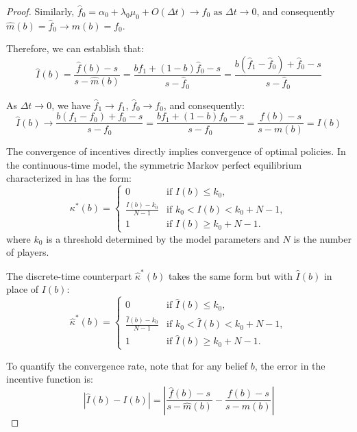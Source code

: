 \begin{proof}
Similarly, $\hat{f}_0 = \alpha_0 + \lambda_0\mu_0 + O(\Delta t) \to f_0 \text{ as } \Delta t \to 0$, and consequently $\hat{m}(b) = \hat{f}_0 \to m(b) = f_0$.

Therefore, we can establish that:
\begin{equation}
    \hat{I}(b) = \frac{\hat{f}(b) - s}{s - \hat{m}(b)} = \frac{b \hat{f}_1 + (1-b) \hat{f}_0 - s}{s - \hat{f}_0} = \frac{b(\hat{f}_1 - \hat{f}_0) + \hat{f}_0 - s}{s - \hat{f}_0}
\end{equation}

As $\Delta t \to 0$, we have $\hat{f}_1 \to f_1$, $\hat{f}_0 \to f_0$, and consequently:
\begin{equation}
    \hat{I}(b) \to \frac{b(f_1 - f_0) + f_0 - s}{s - f_0} = \frac{b f_1 + (1-b) f_0 - s}{s - f_0} = \frac{f(b) - s}{s - m(b)} = I(b)
\end{equation}

The convergence of incentives directly implies convergence of optimal policies. In the continuous-time model, the symmetric Markov perfect equilibrium characterized in \citet{keller2020undiscounted} has the form:
\begin{equation}
\kappa^*(b) = 
\begin{cases}
0 & \text{if } I(b) \leq k_0, \\
\frac{I(b)-k_0}{N-1} & \text{if } k_0 < I(b) < k_0 + N - 1, \\
1 & \text{if } I(b) \geq k_0 + N - 1.
\end{cases}
\end{equation}
where $k_0$ is a threshold determined by the model parameters and $N$ is the number of players.

The discrete-time counterpart $\hat{\kappa}^*(b)$ takes the same form but with $\hat{I}(b)$ in place of $I(b)$:
\begin{equation}
\hat{\kappa}^*(b) = 
\begin{cases}
0 & \text{if } \hat{I}(b) \leq k_0, \\
\frac{\hat{I}(b)-k_0}{N-1} & \text{if } k_0 < \hat{I}(b) < k_0 + N - 1, \\
1 & \text{if } \hat{I}(b) \geq k_0 + N - 1.
\end{cases}
\end{equation}

To quantify the convergence rate, note that for any belief $b$, the error in the incentive function is:
\begin{equation}
    |\hat{I}(b) - I(b)| = \left|\frac{\hat{f}(b) - s}{s - \hat{m}(b)} - \frac{f(b) - s}{s - m(b)}\right|
\end{equation}


\end{proof}
